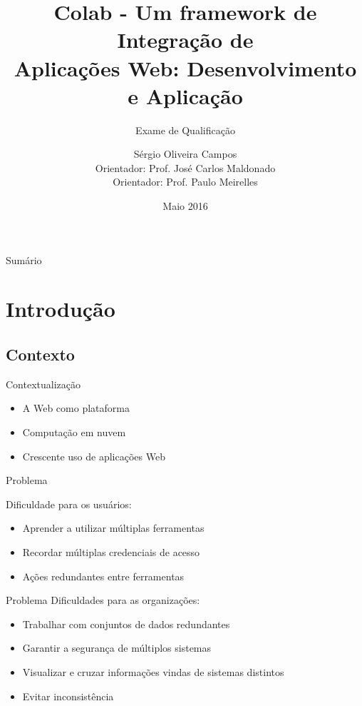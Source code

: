\documentclass{beamer}
\title[Colab - Um framework de Integração de Aplicações Web]
{Colab - Um framework de Integração de\\Aplicações Web: Desenvolvimento e Aplicação}
\subtitle{Exame de Qualificação}
\author[Sérgio Oliveira Campos (ICMC) – 2016]{Sérgio Oliveira Campos\inst{1}\\{\small Orientador: Prof. José Carlos Maldonado\inst{1}}\\{\small Orientador: Prof. Paulo Meirelles\inst{2}}}
\institute[ICMC] %
{
  \inst{1}%
  Instituto de Ciências Matemáticas e de Computação – ICMC\\
  Universidade de São Paulo
  \and
  \inst{2}%
  Faculdade de Engenharias do Gama – FGA\\
  Universidade de Brasília
}
\date{Maio 2016}
\begin{document}
\begin{frame}{Sumário}
  \tableofcontents
\end{frame}

\section{Introdução}

\subsection{Contexto}

\begin{frame}{Contextualização}

  \begin{itemize}
  \item {
    A Web como plataforma \cite{OReilly2007}
  }
  \item{
    Computação em nuvem
  }
  \item {
    Crescente uso de aplicações Web
  }
  \end{itemize}
 
\end{frame}


\begin{frame}{Problema}

  Dificuldade para os usuários:  
  \begin{itemize}
  \item {
    Aprender a utilizar múltiplas ferramentas
  }
  \item {
    Recordar múltiplas credenciais de acesso
  }
  \item {
    Ações redundantes entre ferramentas
  }
  \end{itemize}
\end{frame}

\begin{frame}{Problema}
  Dificuldades para as organizações:
  \begin{itemize}

  \item {
    Trabalhar com conjuntos de dados redundantes
  }
  \item {
    Garantir a segurança de múltiplos sistemas
  }
  \item {
    Visualizar e cruzar informações vindas de sistemas distintos
  }
  \item {
    Evitar inconsistência
  }
  
  \end{itemize}
\end{frame}
\end{document}
